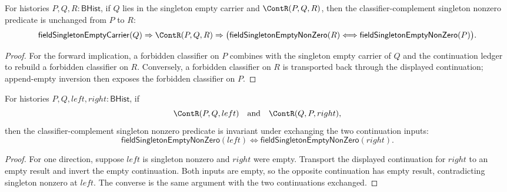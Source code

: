 \begin{theorem}
\label{thm:field-singleton-empty-nonzero-continuation-left-endpoint-cancel-iff}
For histories $P,Q,R:\mathsf{BHist}$, if $Q$ lies in the singleton empty
carrier and $\ContR(P,Q,R)$, then the classifier-complement singleton nonzero
predicate is unchanged from $P$ to $R$:
$$
\mathsf{fieldSingletonEmptyCarrier}(Q)\Rightarrow
\ContR(P,Q,R)\Rightarrow
\bigl(
\mathsf{fieldSingletonEmptyNonZero}(R)
\Longleftrightarrow
\mathsf{fieldSingletonEmptyNonZero}(P)
\bigr).
$$
\end{theorem}
\begin{proof}
For the forward implication, a forbidden classifier on $P$ combines with the
singleton empty carrier of $Q$ and the continuation ledger to rebuild a
forbidden classifier on $R$. Conversely, a forbidden classifier on $R$ is
transported back through the displayed continuation; append-empty inversion
then exposes the forbidden classifier on $P$.
\end{proof}

\begin{theorem}
\label{thm:fieldup-singleton-empty-nonzero-continuation-comm}
For histories $P,Q,left,right:\mathsf{BHist}$, if
$$
\ContR(P,Q,left)
\quad\text{and}\quad
\ContR(Q,P,right),
$$
then the classifier-complement singleton nonzero predicate is invariant under
exchanging the two continuation inputs:
$$
\mathsf{fieldSingletonEmptyNonZero}(left)
\Longleftrightarrow
\mathsf{fieldSingletonEmptyNonZero}(right).
$$
\end{theorem}
\begin{proof}
For one direction, suppose $left$ is singleton nonzero and $right$ were empty.
Transport the displayed continuation for $right$ to an empty result and invert
the empty continuation. Both inputs are empty, so the opposite continuation has
empty result, contradicting singleton nonzero at $left$. The converse is the
same argument with the two continuations exchanged.
\end{proof}

